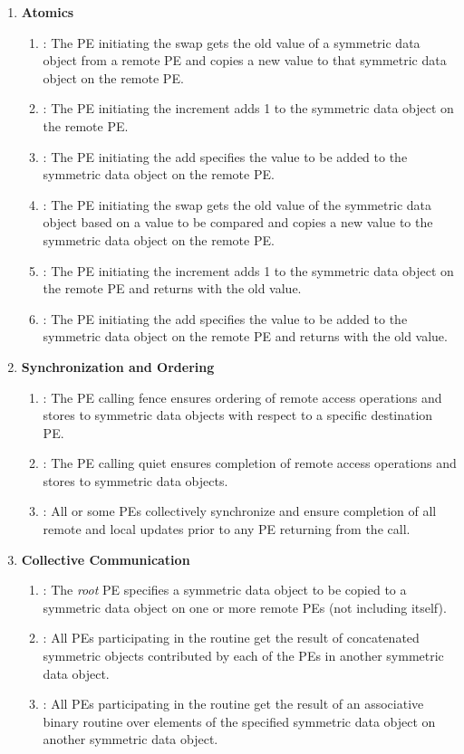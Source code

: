 \begin{enumerate}
\item \textbf{Atomics}
\begin{enumerate}
\item {}: The \ac{PE} initiating the swap gets the old value of a symmetric data object from a remote \ac{PE} and copies a new value to that symmetric data object on the remote \ac{PE}.
\item {}: The \ac{PE} initiating the increment adds 1 to the symmetric data object on the remote \ac{PE}.
\item {}: The \ac{PE} initiating the add specifies the value to be added to the symmetric data object on the remote \ac{PE}.
\item {}: The \ac{PE} initiating the swap gets the old value of the symmetric data object based on a value to be compared and copies a new value to the symmetric data object on the remote \ac{PE}.
\item {}: The \ac{PE} initiating the increment adds 1 to the symmetric data object on the remote \ac{PE} and returns with the old value.
\item {}: The \ac{PE} initiating the add specifies the value to be added to the symmetric data object on the remote \ac{PE} and returns with the old value.
\end{enumerate}

\item \textbf{Synchronization and Ordering}
\begin{enumerate}
\item {}: The \ac{PE} calling fence ensures ordering of remote access operations and stores to symmetric data objects with respect to a specific destination \ac{PE}. 
\item {}: The \ac{PE} calling quiet ensures completion of remote access operations and stores to symmetric data objects. 
\item {}: All or some \ac{PE}s collectively synchronize and ensure completion of all remote and local updates prior to any \ac{PE} returning from the call.
\end{enumerate}

\item \textbf{Collective Communication}
\begin{enumerate}
\item {}: The \textit{root} \ac{PE} specifies a symmetric data object to be copied to a symmetric data object on one or more remote \acp{PE} (not including itself). 
\item {}: All \acp{PE} participating in the routine get the result of concatenated symmetric objects contributed by each of the \acp{PE} in another symmetric data object.
\item {}: All \acp{PE} participating in the routine get the result of an associative binary routine over elements of the specified symmetric data object on another symmetric data object. 
\end{enumerate}


\end{enumerate}

